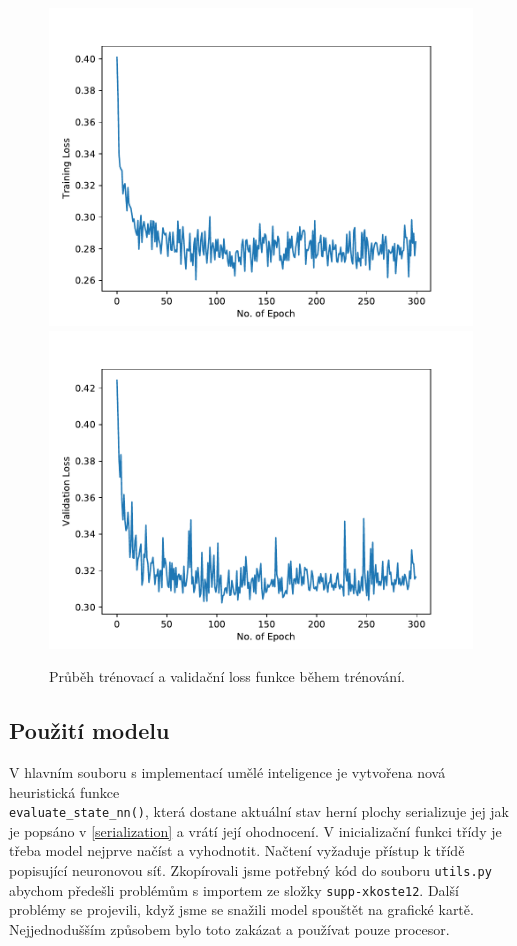 \documentclass[a4paper,11pt]{article}
\begin{document}
		\begin{figure}[h]
			\centering
			\includegraphics[scale=0.5]{training_loss.pdf}
			\includegraphics[scale=0.5]{valid_loss.pdf}
			\caption{Průběh trénovací a validační loss funkce během trénování.}
			\label{fig:loss}
		\end{figure}
	
	\subsection{Použití modelu}
		V hlavním souboru s implementací umělé inteligence je vytvořena nová heuristická funkce\\\texttt{evaluate\_state\_nn()}, která dostane aktuální stav herní plochy serializuje jej jak je popsáno v \ref{serialization} a vrátí její ohodnocení. V inicializační funkci třídy je třeba model nejprve načíst a vyhodnotit. Načtení vyžaduje přístup k třídě popisující neuronovou síť. Zkopírovali jsme potřebný kód do souboru \texttt{utils.py} abychom předešli problémům s importem ze složky \texttt{supp-xkoste12}. Další problémy se projevili, když jsme se snažili model spouštět na grafické kartě. Nejjednodušším způsobem bylo toto zakázat a používat pouze procesor.
	
\end{document}

